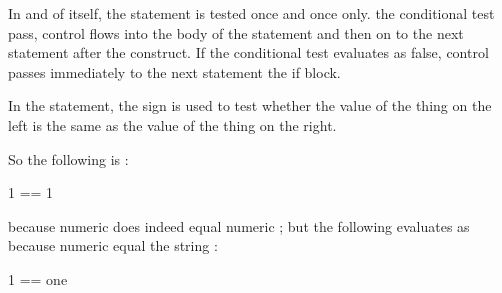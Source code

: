 \documentclass[letterpaper,10pt,english]{sphinxmanual}
\begin{document}
\begin{sphinxVerbatim}[commandchars=\\\{\}]
 

\end{sphinxVerbatim}

In and of itself, the  statement is tested once and once only.  the conditional test pass, control flows into the body of the  statement and then on to the next statement after the  construct. If the conditional test evaluates as false, control passes immediately to the next statement  the if block.

In the  statement, the \sphinxcode{\sphinxupquote{==}} sign is used to test whether the value of the thing on the left is the same as the value of the thing on the right.

So the following is :

{
\begin{sphinxVerbatim}[commandchars=\\\{\}]
\llap{\color{nbsphinxin}[ ]:\,\hspace{\fboxrule}\hspace{\fboxsep}}1 == 1
\end{sphinxVerbatim}
}

because numeric  does indeed equal numeric ; but the following evaluates as  because numeric   equal the string :

{
\begin{sphinxVerbatim}[commandchars=\\\{\}]
\llap{\color{nbsphinxin}[ ]:\,\hspace{\fboxrule}\hspace{\fboxsep}}1 == \PYGZsq{}one\PYGZsq{}
\end{sphinxVerbatim}
}
\end{document}
